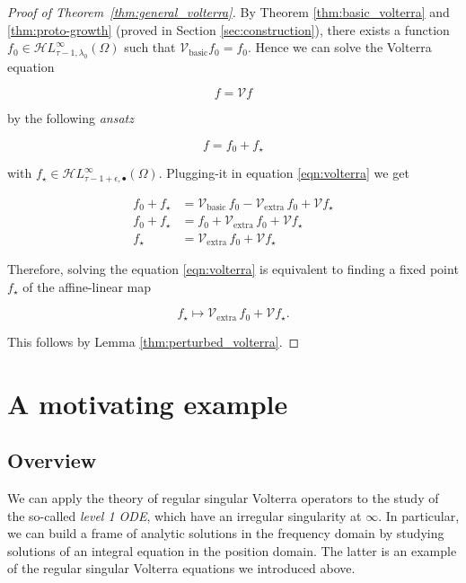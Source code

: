 \documentclass{article}
\theoremstyle{plain}
\newcommand{\singexp}[2]{\mathcal{H}L^\infty_{#1, #2}}
\newcommand{\singexpalg}[1]{\singexp{#1}{\bullet}}
\newcommand{\volterra}{\mathcal{V}}
\newcommand{\hardpart}{\mathcal{V}_\text{basic}}
\newcommand{\softpart}{\mathcal{V}_\text{extra}}
\begin{document}
\begin{proof}[Proof of Theorem~\ref{thm:general_volterra}]


By Theorem \ref{thm:basic_volterra} and \ref{thm:proto-growth} (proved in Section \ref{sec:construction}), there exists a function $f_0\in \singexp{\tau-1}{\lambda_0}(\Omega)$ such that $\hardpart f_0= f_0$. Hence we can solve the Volterra equation 

\begin{equation}\label{eqn:volterra}
    f = \volterra f
\end{equation} 

by the following \textit{ansatz}

\[ f= f_0 + f_\star\]

with $f_\star\in\singexpalg{\tau-1+\epsilon}(\Omega)$. Plugging-it in equation \eqref{eqn:volterra} we get 

\begin{align*}
    f_0 + f_\star & = \hardpart\,f_0 - \softpart \,f_0 + \volterra f_\star \\
f_0 + f_\star & = f_0 + \softpart \,f_0 + \volterra f_\star \\
f_\star & = \softpart \,f_0 + \volterra f_\star
\end{align*}

Therefore, solving the equation \eqref{eqn:volterra} is equivalent to finding a fixed point $f_\star$ of the affine-linear map

\[ f_\star \mapsto \softpart\,f_0 + \volterra f_\star. \]

This follows by Lemma \ref{thm:perturbed_volterra}.
\end{proof}


\section{A motivating example}\label{sec:example}
\subsection{Overview}

We can apply the theory of regular singular Volterra operators to the study of the so-called \textit{level 1 ODE}, which have an irregular singularity at $\infty$. In particular, we can build a frame of analytic solutions in the frequency domain by studying solutions of an integral equation in the position domain. The latter is an example of the regular singular Volterra equations we introduced above.    
\end{document}
